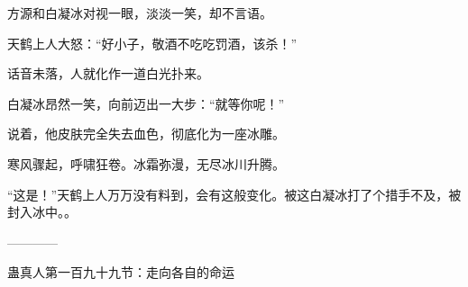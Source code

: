 \begin{this_body}
方源和白凝冰对视一眼，淡淡一笑，却不言语。

天鹤上人大怒：“好小子，敬酒不吃吃罚酒，该杀！”

话音未落，人就化作一道白光扑来。

白凝冰昂然一笑，向前迈出一大步：“就等你呢！”

说着，他皮肤完全失去血色，彻底化为一座冰雕。

寒风骤起，呼啸狂卷。冰霜弥漫，无尽冰川升腾。

“这是！”天鹤上人万万没有料到，会有这般变化。被这白凝冰打了个措手不及，被封入冰中。。

------------

蛊真人第一百九十九节：走向各自的命运

\end{this_body}

